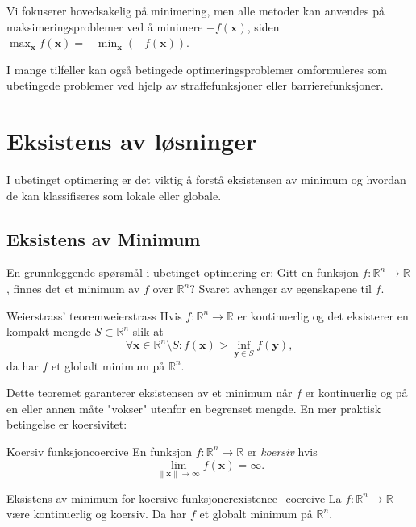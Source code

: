 Vi fokuserer hovedsakelig på minimering, men alle metoder kan anvendes på maksimeringsproblemer ved å minimere \(-f(\symbf{x})\), siden \(\max_{\symbf{x}} f(\symbf{x}) = -\min_{\symbf{x}} (-f(\symbf{x}))\).

I mange tilfeller kan også betingede optimeringsproblemer omformuleres som ubetingede problemer ved hjelp av straffefunksjoner eller barrierefunksjoner.

\section{Eksistens av løsninger}
\label{sec:existence_global_local_minimum}
I ubetinget optimering er det viktig å forstå eksistensen av minimum og hvordan de kan klassifiseres som lokale eller globale.

\subsection{Eksistens av Minimum}
\label{subsec:existence_of_minimum}

En grunnleggende spørsmål i ubetinget optimering er: Gitt en funksjon $f: \mathbb{R}^n \to \mathbb{R}$, finnes det et minimum av $f$ over $\mathbb{R}^n$? Svaret avhenger av egenskapene til $f$.

\begin{theorem}{Weierstrass' teorem}{weierstrass}
	Hvis $f: \mathbb{R}^n \to \mathbb{R}$ er kontinuerlig og det eksisterer en kompakt mengde $S \subset \mathbb{R}^n$ slik at
	\[
		\forall \symbf{x} \in \mathbb{R}^n \setminus S: f(\symbf{x}) > \inf_{\symbf{y} \in S} f(\symbf{y}),
	\]
	da har $f$ et globalt minimum på $\mathbb{R}^n$.
\end{theorem}

Dette teoremet garanterer eksistensen av et minimum når $f$ er kontinuerlig og på en eller annen måte "vokser" utenfor en begrenset mengde. En mer praktisk betingelse er koersivitet:

\begin{definition}{Koersiv funksjon}{coercive}
	En funksjon $f: \mathbb{R}^n \to \mathbb{R}$ er \emph{koersiv} hvis
	\[
		\lim_{\|\symbf{x}\| \to \infty} f(\symbf{x}) = \infty.
	\]
\end{definition}

\begin{proposition}{Eksistens av minimum for koersive funksjoner}{existence_coercive}
	La $f: \mathbb{R}^n \to \mathbb{R}$ være kontinuerlig og koersiv. Da har $f$ et globalt minimum på $\mathbb{R}^n$.
\end{proposition}

